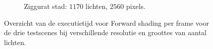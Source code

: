 \begin{figure}[t]
\begin{adjustbox}{minipage=\textwidth, scale=0.6}
\begin{subfigure}[b]{0.83\textwidth}
      \label{fig:ts-frames-forward:city-low}
    \end{subfigure}
  \end{adjustbox} %
  \begin{adjustbox}{minipage=\textwidth, scale=0.6}
    \begin{subfigure}[b]{0.83\textwidth}
      \centering
      \def\svgwidth{\textwidth}
      
      \caption{Ziggurat stad: $1170$ lichten, $2560$ pixels.}
      \label{fig:ts-frames-forward:city-high}
    \end{subfigure}
  \end{adjustbox}
  \caption{Overzicht van de executietijd voor Forward shading per frame voor de
           drie testscenes bij verschillende resolutie en groottes van aantal
           lichten.}
  \label{fig:hs-exec-frames-forward}
\end{figure}

